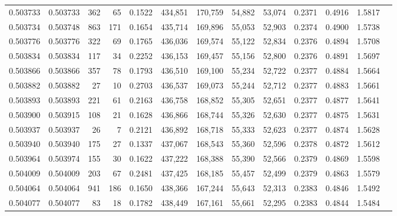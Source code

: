 \begin{tabular}{rrrrrrrrrrrrr}
0.503733 & 0.503733 &   362 &    65 &                                     0.1522 & 434,851 & 170,759 &  54,882 &  53,074 & 0.2371 & 0.4916 & 1.5817 \\
0.503734 & 0.503748 &   863 &   171 &                                     0.1654 & 435,714 & 169,896 &  55,053 &  52,903 & 0.2374 & 0.4900 & 1.5738 \\
0.503776 & 0.503776 &   322 &    69 &                                     0.1765 & 436,036 & 169,574 &  55,122 &  52,834 & 0.2376 & 0.4894 & 1.5708 \\
0.503834 & 0.503834 &   117 &    34 &                                     0.2252 & 436,153 & 169,457 &  55,156 &  52,800 & 0.2376 & 0.4891 & 1.5697 \\
0.503866 & 0.503866 &   357 &    78 &                                     0.1793 & 436,510 & 169,100 &  55,234 &  52,722 & 0.2377 & 0.4884 & 1.5664 \\
0.503882 & 0.503882 &    27 &    10 &                                     0.2703 & 436,537 & 169,073 &  55,244 &  52,712 & 0.2377 & 0.4883 & 1.5661 \\
0.503893 & 0.503893 &   221 &    61 &                                     0.2163 & 436,758 & 168,852 &  55,305 &  52,651 & 0.2377 & 0.4877 & 1.5641 \\
0.503900 & 0.503915 &   108 &    21 &                                     0.1628 & 436,866 & 168,744 &  55,326 &  52,630 & 0.2377 & 0.4875 & 1.5631 \\
0.503937 & 0.503937 &    26 &     7 &                                     0.2121 & 436,892 & 168,718 &  55,333 &  52,623 & 0.2377 & 0.4874 & 1.5628 \\
0.503940 & 0.503940 &   175 &    27 &                                     0.1337 & 437,067 & 168,543 &  55,360 &  52,596 & 0.2378 & 0.4872 & 1.5612 \\
0.503964 & 0.503974 &   155 &    30 &                                     0.1622 & 437,222 & 168,388 &  55,390 &  52,566 & 0.2379 & 0.4869 & 1.5598 \\
0.504009 & 0.504009 &   203 &    67 &                                     0.2481 & 437,425 & 168,185 &  55,457 &  52,499 & 0.2379 & 0.4863 & 1.5579 \\
0.504064 & 0.504064 &   941 &   186 &                                     0.1650 & 438,366 & 167,244 &  55,643 &  52,313 & 0.2383 & 0.4846 & 1.5492 \\
0.504077 & 0.504077 &    83 &    18 &                                     0.1782 & 438,449 & 167,161 &  55,661 &  52,295 & 0.2383 & 0.4844 & 1.5484 \\

\end{tabular}
